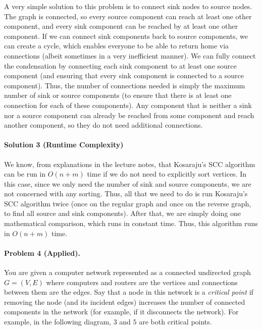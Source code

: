 \documentclass[11pt]{article}
\begin{document}
A very simple solution to this problem is to connect sink nodes to source nodes. The graph is connected, so every source component can reach at least one other component, and every sink component can be reached by at least one other component. If we can connect sink components back to source components, we can create a cycle, which enables everyone to be able to return home via connections (albeit sometimes in a very inefficient manner). We can fully connect the condensation by connecting each sink component to at least one source component (and ensuring that every sink component is connected to a source component). Thus, the number of connections needed is simply the maximum number of sink or source components (to ensure that there is at least one connection for each of these components). Any component that is neither a sink nor a source component can already be reached from some component and reach another component, so they do not need additional connections. 

\paragraph{Solution 3 (Runtime Complexity)}

We know, from explanations in the lecture notes, that Kosaraju's SCC algorithm can be run in $O(n + m)$ time if we do not need to explicitly sort vertices. In this case, since we only need the number of sink and source components, we are not concerned with any sorting. Thus, all that we need to do is run Kosaraju's SCC algorithm twice (once on the regular graph and once on the reverse graph, to find all source and sink components). After that, we are simply doing one mathematical comparison, which runs in constant time. Thus, this algorithm runs in $O(n + m)$ time.


\newpage
\paragraph{Problem 4 (Applied).} You are given a computer network represented as a connected undirected graph $G=(V, E)$ where computers and routers are the vertices and connections between them are the edges. Say that a node in this network is a \textit{critical point} if removing the node (and its incident edges) increases the number of connected components in the network (for example, if it disconnects the network). For example, in the following diagram, $3$ and $5$ are both critical points.
\end{document}
